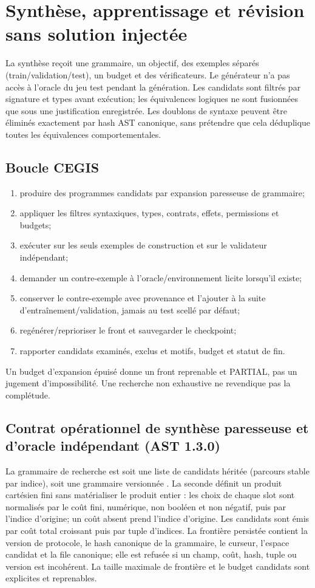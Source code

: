 \documentclass[10pt,a4paper]{article}
\newcommand{\code}[1]{\path{#1}}
\begin{document}
\section{Synthèse, apprentissage et révision sans solution injectée}
La synthèse reçoit une grammaire, un objectif, des exemples séparés (train/validation/test), un budget et des vérificateurs. Le générateur n'a pas accès à l'oracle du jeu test pendant la génération. Les candidats sont filtrés par signature et types avant exécution; les équivalences logiques ne sont fusionnées que sous une justification enregistrée. Les doublons de syntaxe peuvent être éliminés exactement par hash AST canonique, sans prétendre que cela déduplique toutes les équivalences comportementales.

\subsection{Boucle CEGIS}
\begin{enumerate}
\item produire des programmes candidats par expansion paresseuse de grammaire;
\item appliquer les filtres syntaxiques, types, contrats, effets, permissions et budgets;
\item exécuter sur les seuls exemples de construction et sur le validateur indépendant;
\item demander un contre-exemple à l'oracle/environnement licite lorsqu'il existe;
\item conserver le contre-exemple avec provenance et l'ajouter à la suite d'entraînement/validation, jamais au test scellé par défaut;
\item regénérer/reprioriser le front et sauvegarder le checkpoint;
\item rapporter candidats examinés, exclus et motifs, budget et statut de fin.
\end{enumerate}
Un budget d'expansion épuisé donne un front reprenable et PARTIAL, pas un jugement d'impossibilité. Une recherche non exhaustive ne revendique pas la complétude.


\subsection{Contrat opérationnel de synthèse paresseuse et d'oracle indépendant (AST 1.3.0)}
La grammaire de recherche est soit une liste de candidats héritée (parcours stable par indice), soit une grammaire versionnée \code{slot\_product}. La seconde définit un produit cartésien fini sans matérialiser le produit entier : les choix de chaque slot sont normalisés par le coût fini, numérique, non booléen et non négatif, puis par l'indice d'origine; un coût absent prend l'indice d'origine. Les candidats sont émis par coût total croissant puis par tuple d'indices. La frontière persistée contient la version de protocole, le hash canonique de la grammaire, le curseur, l'espace candidat et la file canonique; elle est refusée si un champ, coût, hash, tuple ou version est incohérent. La taille maximale de frontière et le budget candidats sont explicites et reprenables.
\end{document}
